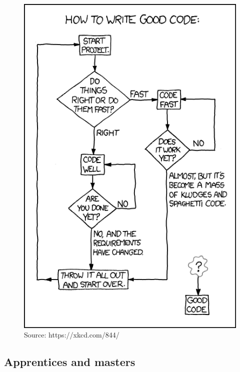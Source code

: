 \documentclass{article}
\begin{document}
\begin{figure}
    \centering
    \includegraphics[scale=0.5]{good_code.png}
    \caption{Source: https://xkcd.com/844/}
\end{figure}


\subsection{Apprentices and masters}
\end{document}

